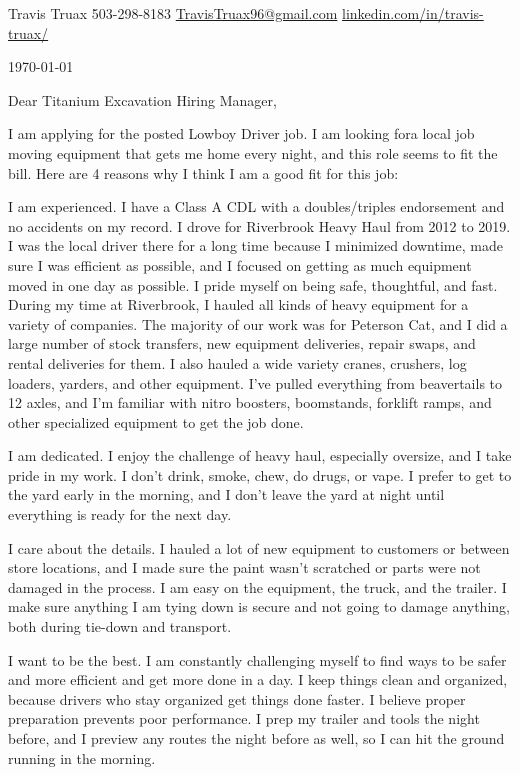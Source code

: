 \documentclass[10pt]{article}
\begin{document}
\titlebar
  {Travis Truax}
  {503-298-8183 \textbar{} \href{mailto:TravisTruax96@gmail.com}{TravisTruax96@gmail.com} \textbar{} \href{https://linkedin.com/in/travis-truax/}{linkedin.com/in/travis-truax/}}

\setlength{\parskip}{0.85em}

{\small \today}

Dear Titanium Excavation Hiring Manager,

I am applying for the posted Lowboy Driver job. I am looking fora local job moving equipment that gets me home every night, and this role seems to fit the bill. Here are 4 reasons why I think I am a good fit for this job:

I am experienced. I have a Class A CDL with a doubles/triples endorsement and no accidents on my record. I drove for Riverbrook Heavy Haul from 2012 to 2019. I was the local driver there for a long time because I minimized downtime, made sure I was efficient as possible, and I focused on getting as much equipment moved in one day as possible. I pride myself on being safe, thoughtful, and fast. During my time at Riverbrook, I hauled all kinds of heavy equipment for a variety of companies. The majority of our work was for Peterson Cat, and I did a large number of stock transfers, new equipment deliveries, repair swaps, and rental deliveries for them. I also hauled a wide variety cranes, crushers, log loaders, yarders, and other equipment. I've pulled everything from beavertails to 12 axles, and I'm familiar with nitro boosters, boomstands, forklift ramps, and other specialized equipment to get the job done. 

I am dedicated. I enjoy the challenge of heavy haul, especially oversize, and I take pride in my work. I don't drink, smoke, chew, do drugs, or vape. I prefer to get to the yard early in the morning, and I don't leave the yard at night until everything is ready for the next day.

I care about the details. I hauled a lot of new equipment to customers or between store locations, and I made sure the paint wasn't scratched or parts were not damaged in the process. I am easy on the equipment, the truck, and the trailer. I make sure anything I am tying down is secure and not going to damage anything, both during tie-down and transport.

I want to be the best. I am constantly challenging myself to find ways to be safer and more efficient and get more done in a day. I keep things clean and organized, because drivers who stay organized get things done faster. I believe proper preparation prevents poor performance. I prep my trailer and tools the night before, and I preview any routes the night before as well, so I can hit the ground running in the morning.
\end{document}
